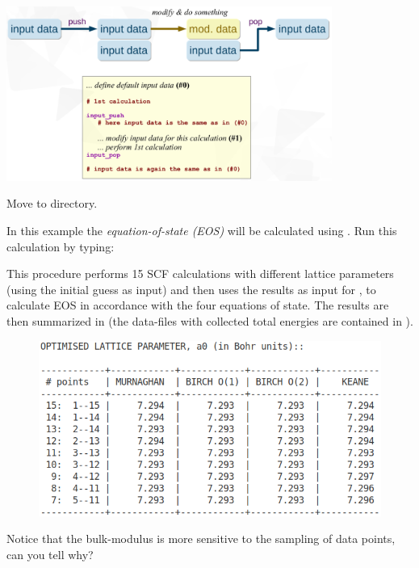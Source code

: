 \documentclass[landscape]{foils}
\begin{document}
\centerline{\includegraphics[width=0.8\textwidth]{figs/i-data-stacking.png}}


Move to  directory.

In this example the
{\em equation-of-state (EOS)} will be calculated using
. Run this calculation by typing:\\

This procedure performs 15 SCF calculations with different lattice
parameters (using the initial guess as input) and then uses the
results as input for , to calculate EOS in accordance with
the four equations of state. The results are then summarized in
 {\small (the  data-files with
  collected total energies are contained in
  )}.

\begin{figure}
\centering
\includegraphics[width=14.0cm]{figs/LATTICE_PARAMETERS.png}
\end{figure}

Notice that the bulk-modulus is more sensitive to the sampling of
data points, can you tell why?
 
\end{document}
